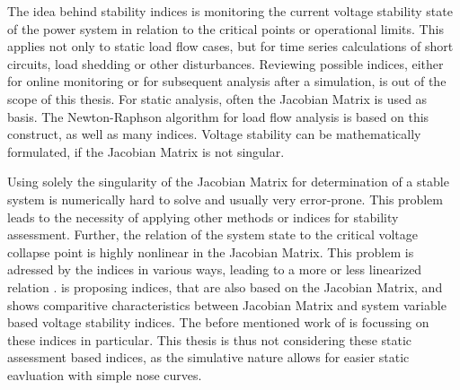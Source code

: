 The idea behind stability indices is monitoring the current voltage stability state of the power system in relation to the critical points or operational limits.
This applies not only to static load flow cases, but for time series calculations of short circuits, load shedding or other disturbances.
Reviewing possible indices, either for online monitoring or for subsequent analysis after a simulation, is out of the scope of this thesis.
For static analysis, often the Jacobian Matrix is used as basis.
The Newton-Raphson algorithm for load flow analysis is based on this construct, as well as many indices.
Voltage stability can be mathematically formulated, if the Jacobian Matrix is not singular. \autocite{danish_2015,doigcardet_2010,machowski_2020}


Using solely the singularity of the Jacobian Matrix for determination of a stable system is numerically hard to solve and usually very error-prone.
This problem leads to the necessity of applying other methods or indices for stability assessment. 
Further, the relation of the system state to the critical voltage collapse point is highly nonlinear in the Jacobian Matrix. 
This problem is adressed by the indices in various ways, leading to a more or less linearized relation \autocite{machowski_2020,danish_2015}. 
\textcite{danish_2015} is proposing indices, that are also based on the Jacobian Matrix, and shows comparitive characteristics between Jacobian Matrix and system variable based voltage stability indices. 
The before mentioned work of \textcite{doigcardet_2010} is focussing on these indices in particular.
This thesis is thus not considering these static assessment based indices, as the simulative nature allows for easier static eavluation with simple nose curves. 

